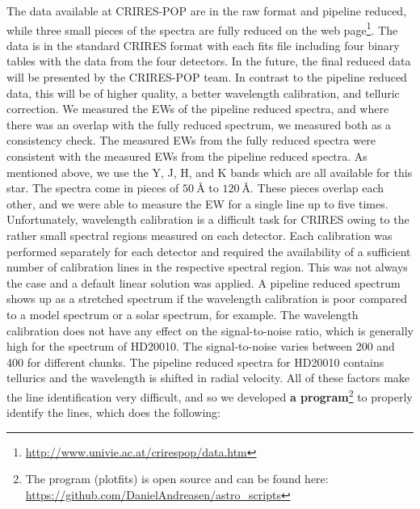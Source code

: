 \documentclass{aa}
\begin{document}
The data available at CRIRES-POP are in the raw format and pipeline
reduced, while three small pieces of the spectra are fully reduced on the web
page\footnote{\url{http://www.univie.ac.at/crirespop/data.htm}}. The data
is in the standard CRIRES format with each fits file including four
binary tables with the data from the four detectors. In the future, the final
reduced data will be presented by the CRIRES-POP team. In contrast to the pipeline reduced data, this
will be of higher quality, a better wavelength calibration, and telluric correction. We
measured the EWs of the pipeline reduced spectra, and where there was
an overlap with the fully reduced spectrum, we measured both as a
consistency check. The measured EWs from the fully reduced spectra were
consistent with the measured EWs from the pipeline reduced spectra. As
mentioned above, we use the Y, J, H, and K bands which are all available
for this star. The spectra come in pieces of $\SI{50}{\angstrom}$
to $\SI{120}{\angstrom}$. These pieces  overlap  each
other, and we were able to measure the EW for a single line up to
five times. Unfortunately, wavelength calibration is a difficult task
for CRIRES owing to the rather small spectral regions measured on each
detector. Each calibration was performed separately for each detector
and required the availability of a sufficient number of calibration
lines in the respective spectral region. This was not always the case
and a default linear solution was applied. A pipeline reduced spectrum
shows up as a stretched spectrum if the wavelength calibration is poor
compared to  a model spectrum or a solar spectrum, for example. The wavelength
calibration does not have any effect on the signal-to-noise ratio, which
is generally high for the spectrum of HD20010. The signal-to-noise
varies between 200 and 400 for different chunks. The pipeline reduced
spectra for HD20010 contains tellurics and the wavelength is shifted in
radial velocity. All of these factors make the line identification very
difficult, and so we developed \textbf{a program}\footnote{The program
(plot\textunderscore{}fits) is open source and can be found here:
\url{https://github.com/DanielAndreasen/astro_scripts}} to properly
identify the lines, which  does the following:
\end{document}
